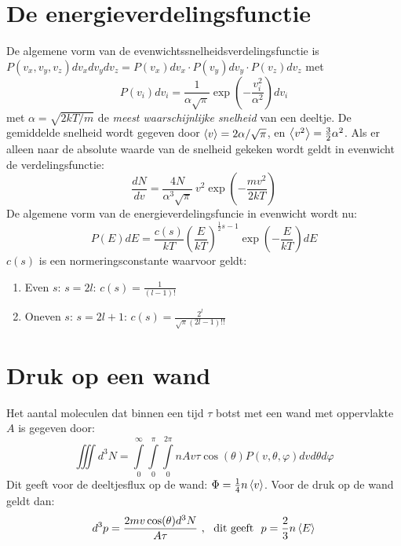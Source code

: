 \documentclass[twoside]{report}
\begin{document}
\section{De energieverdelingsfunctie}
De algemene vorm van de evenwichtssnelheidsverdelingsfunctie is\\
$P(v_x,v_y,v_z)dv_xdv_ydv_z=P(v_x)dv_x\cdot P(v_y)dv_y\cdot P(v_z)dv_z$ met
\[
P(v_i)dv_i=\frac{1}{\alpha\sqrt{\pi}}\exp\left(-\frac{v_i^2}{\alpha^2}\right)dv_i
\]
met $\alpha=\sqrt{2kT/m}$ de {\it meest waarschijnlijke snelheid} van een
deeltje. De gemiddelde snelheid wordt gegeven door $\left\langle v \right\rangle=2\alpha/\sqrt{\pi}$,
en $\left\langle v^2 \right\rangle=\frac{3}{2}\alpha^2$. Als er alleen naar de absolute waarde van de
snelheid gekeken wordt geldt in evenwicht de verdelingsfunctie:
\[
\frac{dN}{dv}=\frac{4N}{\alpha^3\sqrt{\pi}}~v^2\exp\left(-\frac{mv^2}{2kT}\right)
\]
De algemene vorm van de energieverdelingsfuncie in evenwicht wordt nu:
\[
P(E)dE=\frac{c(s)}{kT}\left(\frac{E}{kT}\right)^{\frac{1}{2}s-1}\exp\left(-\frac{E}{kT}\right)dE
\]
$c(s)$ is een normeringsconstante waarvoor geldt:
\begin{enumerate}
\item Even $s$: $s=2l$: $\displaystyle c(s)=\frac{1}{(l-1)!}$
\item Oneven $s$: $s=2l+1$: $\displaystyle c(s)=\frac{2^l}{\sqrt{\pi}(2l-1)!!}$
\end{enumerate}

\section{Druk op een wand}
Het aantal moleculen dat binnen een tijd $\tau$ botst met een wand met
oppervlakte $A$ is gegeven door:
\[
\iiint d^3N=\int\limits_0^\infty \int\limits_0^\pi \int\limits_0^{2\pi}
nAv\tau\cos(\theta)P(v,\theta,\varphi)dvd\theta d\varphi
\]
Dit geeft voor de deeltjesflux op de wand: $\Phi=\mbox{$\frac{1}{4}$} n\left\langle v \right\rangle$. Voor de
druk op de wand geldt dan:
\[
d^3p=\frac{2mv\cos(\theta)d^3N}{A\tau}~,~~\mbox{dit geeft}~~p=\frac{2}{3}n\left\langle E \right\rangle
\]
\end{document}
